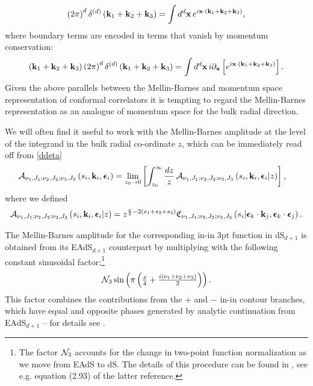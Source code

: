 \documentclass[11pt,a4paper]{article}
\begin{document}
\begin{equation}
    \left(2\pi\right)^d \delta^{(d)}\left({\bf k}_1+{\bf k}_2+{\bf k}_3\right) = \int d^d{\bf x}\, e^{i {\bf x} \cdot \left({\bf k}_1+{\bf k}_2+{\bf k}_3\right)},
\end{equation}
where boundary terms are encoded in terms that vanish by momentum conservation:
\begin{equation}
   \left({\bf k}_1+{\bf k}_2+{\bf k}_3\right) \left(2\pi\right)^d \delta^{(d)}\left({\bf k}_1+{\bf k}_2+{\bf k}_3\right) = \int d^d{\bf x}\, i \partial_{{\bf x}}\left[e^{i {\bf x} \cdot \left({\bf k}_1+{\bf k}_2+{\bf k}_3\right)}\right].
\end{equation}
Given the above parallels between the Mellin-Barnes and momentum space representation of conformal correlators it is tempting to regard the Mellin-Barnes representation as an analogue of momentum space for the bulk radial direction.


 We will often find it useful to work with the Mellin-Barnes amplitude at the level of the integrand in the bulk radial co-ordinate $z$, which can be immediately read off from \eqref{ddeta}
 \begin{align}\label{MBAz1}
     {\cal A}_{\nu_1,J_1;\nu_2,J_2;\nu_3,J_3}\left(s_i,{\bf k}_i,\boldsymbol{\epsilon}_i\right) &= \lim_{z_0 \to 0}\left[\int_{z_0}^{\infty}\frac{dz}{z}\, {\cal A}_{\nu_1,J_1;\nu_2,J_2;\nu_3,J_3}\left(s_i,{\bf k}_i,\boldsymbol{\epsilon}_i| z \right)\right],
\end{align}
where we defined
\begin{multline}\label{MBAz2}
  {\cal A}_{\nu_1,J_1;\nu_2,J_2;\nu_3,J_3}\left(s_i,{\bf k}_i,\boldsymbol{\epsilon}_i| z \right) =z^{\frac{x}{2}-2\left(s_1+s_2+s_3\right)}\mathfrak{C}_{\nu_1,J_1;\nu_2,J_2;\nu_3,J_3}\left(s_i|\boldsymbol{\epsilon}_k \cdot {\bf k}_j,\boldsymbol{\epsilon}_k \cdot \boldsymbol{\epsilon}_j\right).  
\end{multline}

The Mellin-Barnes amplitude for the corresponding in-in 3pt function in dS$_{d+1}$ is obtained from its EAdS$_{d+1}$ counterpart by multiplying with the following constant sinusoidal factor:\footnote{The factor ${\cal N}_3$ accounts for the change in two-point function normalization as we move from EAdS to dS. The details of this procedure can be found in \cite{Sleight:2019hfp}, see e.g. equation (2.93) of the latter reference.}
\begin{equation}\label{sinefactor3pt}
   {\cal N}_3 \sin \left(\pi \left(\tfrac{x}{4}+\tfrac{i\left(\nu_1+\nu_2+\nu_3\right)}{2}\right)\right).
\end{equation}
This factor combines the contributions from the $+$ and $-$ in-in contour branches, which have equal and opposite phases generated by analytic continuation from EAdS$_{d+1}$ -- for details see \cite{Sleight:2019hfp}.
\end{document}
